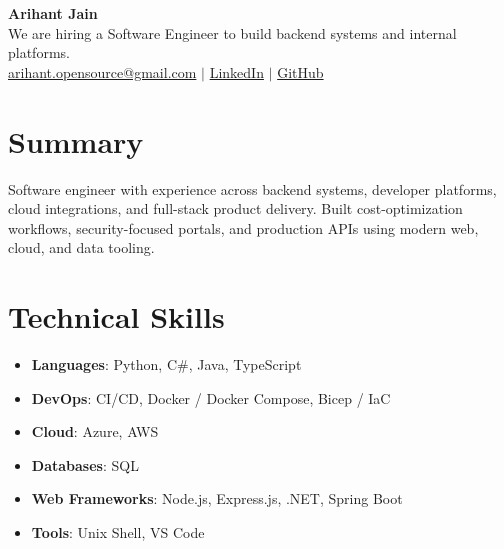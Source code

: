 \documentclass[11pt,a4paper]{article}
\begin{document}
\begin{center}
{\LARGE \textbf{Arihant Jain}}
\\ We are hiring a Software Engineer to build backend systems and internal platforms.
\\ \href{mailto:arihant.opensource@gmail.com}{arihant.opensource@gmail.com} $\mid$ \href{https://linkedin.com/in/arihantjain1208}{LinkedIn} $\mid$ \href{https://github.com/Arihant1208}{GitHub}
\end{center}

\section{Summary}
Software engineer with experience across backend systems, developer platforms, cloud integrations, and full-stack product delivery. Built cost-optimization workflows, security-focused portals, and production APIs using modern web, cloud, and data tooling.

\section{Technical Skills}
\begin{itemize}
  \item \textbf{Languages}: Python, C\#, Java, TypeScript
  \item \textbf{DevOps}: CI/CD, Docker / Docker Compose, Bicep / IaC
  \item \textbf{Cloud}: Azure, AWS
  \item \textbf{Databases}: SQL
  \item \textbf{Web Frameworks}: Node.js, Express.js, .NET, Spring Boot
  \item \textbf{Tools}: Unix Shell, VS Code
\end{itemize}
\end{document}
